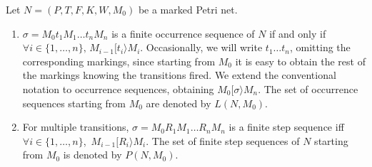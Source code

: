 \begin{definition} 
Let $N=(P,T,F,K,W,M_0)$ be a marked Petri net.
\begin{enumerate}
\item $\sigma = M_0 t_1 M_1 \ldots t_n M_n$ is a finite occurrence sequence of $N$
if and only if $\forall i \in \{1,\ldots,n\},\,M_{i-1} [ t_i \rangle M_i$.
Occasionally, we will write $t_1 \ldots t_n$, omitting the corresponding markings, since starting from
$M_0$ it is easy to obtain the rest of the markings knowing the transitions fired.
We extend the conventional notation to occurrence sequences, 
obtaining $M_0 [ \sigma \rangle M_n$.
The set of occurrence sequences starting from $M_0$ are denoted by $L(N,M_0)$.

\item For multiple transitions, $\sigma = M_0 R_1 M_1 \ldots R_n M_n$ is a finite step sequence
iff $\forall i \in \{1,\ldots,n\}$, $\,M_{i-1} [ R_i \rangle M_i$.
The set of finite step sequences of $N$ starting from $M_0$ is denoted by $P(N,M_0)$.
\end{enumerate}
\end{definition}



%
%
%

